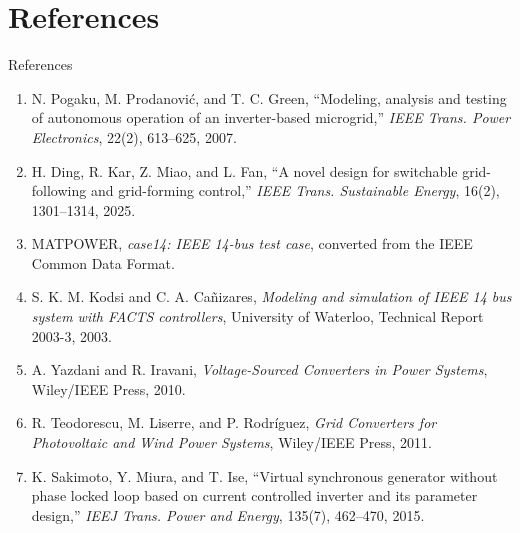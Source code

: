 \documentclass{beamer}
\begin{document}
\section{References}
\begin{frame}{References}
\scriptsize
\begin{enumerate}\setlength{\itemsep}{.12cm}
\item N. Pogaku, M. Prodanovi\'{c}, and T. C. Green, ``Modeling, analysis and testing of autonomous operation of an inverter-based microgrid,'' \emph{IEEE Trans. Power Electronics}, 22(2), 613--625, 2007.
\item H. Ding, R. Kar, Z. Miao, and L. Fan, ``A novel design for switchable grid-following and grid-forming control,'' \emph{IEEE Trans. Sustainable Energy}, 16(2), 1301--1314, 2025.
\item MATPOWER, \emph{case14: IEEE 14-bus test case}, converted from the IEEE Common Data Format.
\item S. K. M. Kodsi and C. A. Ca\~nizares, \emph{Modeling and simulation of IEEE 14 bus system with FACTS controllers}, University of Waterloo, Technical Report 2003-3, 2003.
\item A. Yazdani and R. Iravani, \emph{Voltage-Sourced Converters in Power Systems}, Wiley/IEEE Press, 2010.
\item R. Teodorescu, M. Liserre, and P. Rodr\'{i}guez, \emph{Grid Converters for Photovoltaic and Wind Power Systems}, Wiley/IEEE Press, 2011.
\item K. Sakimoto, Y. Miura, and T. Ise, ``Virtual synchronous generator without phase locked loop based on current controlled inverter and its parameter design,'' \emph{IEEJ Trans. Power and Energy}, 135(7), 462--470, 2015.
\end{enumerate}
\end{frame}
\end{document}
